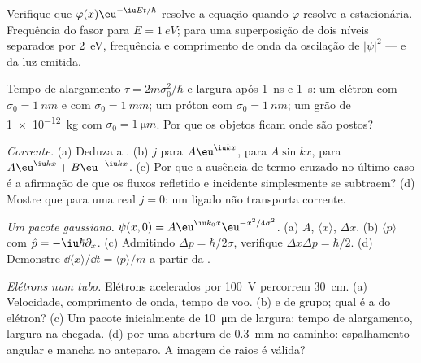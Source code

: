 \begin{exercise}[$\star$]\label{exo:b2:schrodinger-wave-functions:3}
Verifique que $\varphi(x)\eu^{-\iu Et/\hbar}$ resolve a equação quando $\varphi$
resolve a estacionária. Frequência do fasor para $E = \qty{1}{eV}$;
para uma superposição de dois níveis separados por \qty{2}{eV}, frequência e
comprimento de onda da oscilação de $|\psi|^2$ --- e da luz
emitida.
\end{exercise}

\begin{exercise}[$\star$]\label{exo:b2:schrodinger-wave-functions:4}
Tempo de alargamento $\tau = 2m\sigma_0^2/\hbar$ e largura após \qty{1}{ns} e
\qty{1}{s}: um elétron com $\sigma_0 = \qty{1}{nm}$ e com $\sigma_0 = \qty{1}{mm}$;
um próton com $\sigma_0 = \qty{1}{nm}$; um grão de \qty{1e-12}{kg} com
$\sigma_0 = \qty{1}{\micro m}$. Por que os objetos ficam onde são postos?
\end{exercise}

\begin{exercise}[$\star\star$]\label{exo:b2:schrodinger-wave-functions:5}
\emph{Corrente.} (a) Deduza a . (b) $j$ para
$A\eu^{\iu kx}$, para $A\sin kx$, para $A\eu^{\iu kx} + B\eu^{-\iu kx}$. (c) Por que
a ausência de termo cruzado no último caso é a afirmação de que
os fluxos refletido e incidente simplesmente se subtraem? (d) Mostre que para uma
 real $j = 0$: um  ligado não transporta corrente.
\end{exercise}

\begin{exercise}[$\star\star$]\label{exo:b2:schrodinger-wave-functions:6}
\emph{Um pacote gaussiano.} $\psi(x,0) = A\eu^{\iu k_0x}\eu^{-x^2/4\sigma^2}$. (a)
$A$, $\langle x\rangle$, $\Delta x$. (b) $\langle p\rangle$ com $\hat p =
-\iu\hbar\partial_x$. (c) Admitindo $\Delta p = \hbar/2\sigma$, verifique
$\Delta x\Delta p = \hbar/2$. (d) Demonstre $\dd\langle x\rangle/\dd t = \langle
p\rangle/m$ a partir da .
\end{exercise}

\begin{exercise}[$\star\star$]\label{exo:b2:schrodinger-wave-functions:7}
\emph{Elétrons num tubo.} Elétrons acelerados por \qty{100}{V}
percorrem \qty{30}{cm}. (a) Velocidade, comprimento de onda, tempo de voo. (b)  e de grupo; qual é a do elétron? (c) Um pacote inicialmente de
\qty{10}{\micro m} de largura: tempo de alargamento, largura na chegada. (d) 
por uma abertura de \qty{0.3}{mm} no caminho: espalhamento angular e mancha no
anteparo. A imagem de raios é válida?
\end{exercise}

